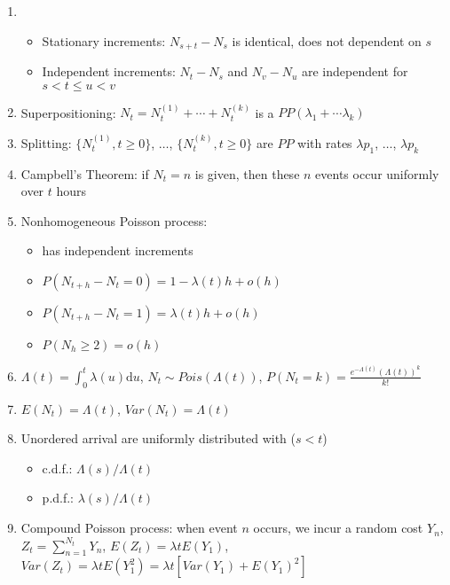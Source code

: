 \documentclass[11pt,a4paper]{article}
\begin{document}
\begin{enumerate}[resume]
\item \begin{itemize}
\item Stationary increments: $N_{s+t} - N_s$ is identical, does not dependent on $s$
\item Independent increments: $N_t - N_s$ and $N_v - N_u$ are independent for $s < t \leq u < v$
\end{itemize}

\item Superpositioning: $N_t = N_t^{(1)} + \cdots + N_t^{(k)}$ is a $PP(\lambda_1 + \cdots \lambda_k)$

\item Splitting: $\{ N_t^{(1)}, t \geq 0 \}$, $\ldots$, $\{ N_t^{(k)}, t \geq 0 \}$ are $PP$ with rates $\lambda p_1$, $\ldots$, $\lambda p_k$

\item Campbell's Theorem: if $N_t = n$ is given, then these $n$ events occur uniformly over $t$ hours

\item Nonhomogeneous Poisson process: \begin{itemize}
\item has independent increments
\item $P(N_{t+h} - N_t = 0) = 1 - \lambda(t) h + o(h)$
\item $P(N_{t+h} - N_t = 1) = \lambda(t) h + o(h)$
\item $P(N_h \geq 2) = o(h)$
\end{itemize}

\item $\displaystyle \Lambda(t) = \int_0^t \lambda(u) \mathrm{d}u$, $N_t \sim Pois \left( \Lambda(t) \right)$, $\displaystyle P(N_t = k) = \frac{e^{-\Lambda(t)} (\Lambda(t))^k}{k!}$

\item $E(N_t) = \Lambda(t)$, $Var(N_t) = \Lambda(t)$

\item Unordered arrival are uniformly distributed with ($s<t$) \begin{itemize}
\item c.d.f.: $\Lambda(s) / \Lambda(t)$
\item p.d.f.: $\lambda(s) / \Lambda(t)$
\end{itemize}

\item Compound Poisson process: when event $n$ occurs, we incur a random cost $Y_n$, \\
$\displaystyle Z_t = \sum_{n=1}^{N_t} Y_n$, $E(Z_t) = \lambda t E(Y_1)$, $Var(Z_t) = \lambda t E(Y_1^2) = \lambda t [Var(Y_1) + E(Y_1)^2]$
\end{enumerate}
\end{document}
